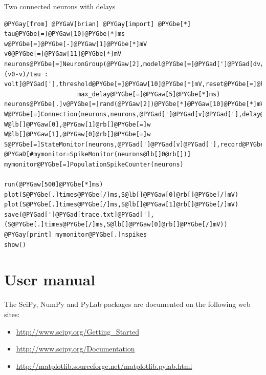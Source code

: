\documentclass[letterpaper,10pt]{manual}
\begin{document}
Two connected neurons with delays

\begin{Verbatim}[commandchars=@\[\]]
@PYGay[from] @PYGaV[brian] @PYGay[import] @PYGbe[*]
tau@PYGbe[=]@PYGaw[10]@PYGbe[*]ms
w@PYGbe[=]@PYGbe[-]@PYGaw[1]@PYGbe[*]mV
v0@PYGbe[=]@PYGaw[11]@PYGbe[*]mV
neurons@PYGbe[=]NeuronGroup(@PYGaw[2],model@PYGbe[=]@PYGad[']@PYGad[dv/dt=(v0-v)/tau : volt]@PYGad['],threshold@PYGbe[=]@PYGaw[10]@PYGbe[*]mV,reset@PYGbe[=]@PYGaw[0]@PYGbe[*]mV,\
                    max_delay@PYGbe[=]@PYGaw[5]@PYGbe[*]ms)
neurons@PYGbe[.]v@PYGbe[=]rand(@PYGaw[2])@PYGbe[*]@PYGaw[10]@PYGbe[*]mV
W@PYGbe[=]Connection(neurons,neurons,@PYGad[']@PYGad[v]@PYGad['],delay@PYGbe[=]@PYGaw[2]@PYGbe[*]ms)
W@lb[]@PYGaw[0],@PYGaw[1]@rb[]@PYGbe[=]w
W@lb[]@PYGaw[1],@PYGaw[0]@rb[]@PYGbe[=]w
S@PYGbe[=]StateMonitor(neurons,@PYGad[']@PYGad[v]@PYGad['],record@PYGbe[=]@PYGaA[True])
@PYGaD[#mymonitor=SpikeMonitor(neurons@lb[]0@rb[])]
mymonitor@PYGbe[=]PopulationSpikeCounter(neurons)

run(@PYGaw[500]@PYGbe[*]ms)
plot(S@PYGbe[.]times@PYGbe[/]ms,S@lb[]@PYGaw[0]@rb[]@PYGbe[/]mV)
plot(S@PYGbe[.]times@PYGbe[/]ms,S@lb[]@PYGaw[1]@rb[]@PYGbe[/]mV)
save(@PYGad[']@PYGad[trace.txt]@PYGad['],(S@PYGbe[.]times@PYGbe[/]ms,S@lb[]@PYGaw[0]@rb[]@PYGbe[/]mV))
@PYGay[print] mymonitor@PYGbe[.]nspikes
show()
\end{Verbatim}

\resetcurrentobjects


\hypertarget{user-manual}{}\chapter{User manual}
The SciPy, NumPy and PyLab packages are documented on the following web sites:
\begin{itemize}
\item {} 
\href{http://www.scipy.org/Getting\_Started}{http://www.scipy.org/Getting\_Started}

\item {} 
\href{http://www.scipy.org/Documentation}{http://www.scipy.org/Documentation}

\item {} 
\href{http://matplotlib.sourceforge.net/matplotlib.pylab.html}{http://matplotlib.sourceforge.net/matplotlib.pylab.html}

\end{itemize}
\end{document}
